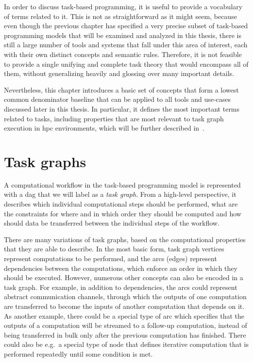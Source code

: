 In order to discuss task-based programming, it is useful to provide a vocabulary of terms related
to it. This is not as straightforward as it might seem, because even though the previous chapter
has specified a very precise subset of task-based programming models that will be examined and
analyzed in this thesis, there is still a large number of tools and systems that fall under this
area of interest, each with their own distinct concepts and semantic rules. Therefore, it is not
feasible to provide a single unifying and complete task theory that would encompass all of them,
without generalizing heavily and glossing over many important details.

Nevertheless, this chapter introduces a basic set of concepts that form a lowest common denominator
baseline that can be applied to all tools and use-cases discussed later in this thesis. In
particular, it defines the most important terms related to tasks, including properties that are
most relevant to task graph execution in \gls{hpc} environments, which will be further
described in~.

\section{Task graphs}
A computational workflow in the task-based programming model is represented with a
\gls{dag} that we will label as a \emph{task graph}. From a high-level
perspective, it describes which individual computational steps should be performed, what are the
constraints for where and in which order they should be computed and how should data be transferred
between the individual steps of the workflow.

There are many variations of task graphs, based on the computational properties that they are able
to describe. In the most basic form, task graph vertices represent computations to be performed,
and the arcs (edges) represent dependencies between the computations, which enforce an order in
which they should be executed. However, numerous other concepts can also be encoded in a task
graph. For example, in addition to dependencies, the arcs could represent abstract communication
channels, through which the outputs of one computation are transferred to become the inputs of
another computation that depends on it. As another example, there could be a special type of arc
which specifies that the outputs of a computation will be streamed to a follow-up computation,
instead of being transferred in bulk only after the previous computation has finished. There could
also be e.g.\ a special type of node that defines iterative computation that is performed
repeatedly until some condition is met.

